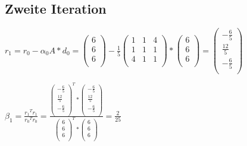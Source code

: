 \documentclass[10pt,DIV10,a4paper]{scrartcl}
\begin{document}
\subsection*{Zweite Iteration}

\(r_1=r_0- \alpha _0 A * d_0=\left(
\begin{array}{c}
 6 \\
 6 \\
 6 \\
\end{array}
\right)-\frac{1}{5} \left(
\begin{array}{ccc}
 1 & 1 & 4 \\
 1 & 1 & 1 \\
 4 & 1 & 1 \\
\end{array}
\right) *\left(
\begin{array}{c}
 6 \\
 6 \\
 6 \\
\end{array}
\right) = \left(
\begin{array}{c}
 -\frac{6}{5} \\
 \frac{12}{5} \\
 -\frac{6}{5} \\
\end{array}
\right)\)

\(\beta _1= \frac{r_1{}^Tr_1}{r_0{}^Tr_0}=\frac{\left(
\begin{array}{c}
 -\frac{6}{5} \\
 \frac{12}{5} \\
 -\frac{6}{5} \\
\end{array}
\right)^T* \left(
\begin{array}{c}
 -\frac{6}{5} \\
 \frac{12}{5} \\
 -\frac{6}{5} \\
\end{array}
\right)}{\left(
\begin{array}{c}
 6 \\
 6 \\
 6 \\
\end{array}
\right)^T* \left(
\begin{array}{c}
 6 \\
 6 \\
 6 \\
\end{array}
\right)}=\frac{2}{25}\)
\end{document}
